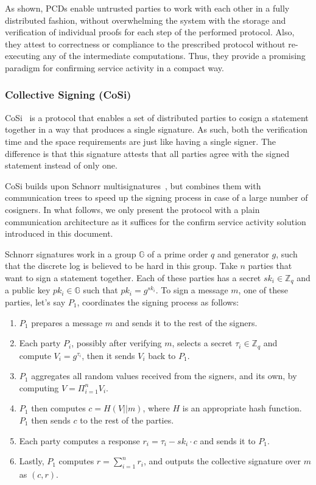 As shown, PCDs enable untrusted parties to work with each other in a fully distributed 
fashion, without overwhelming the system with the storage and verification of individual 
proofs for each step of the performed protocol. Also, they attest to correctness or compliance  
to the prescribed protocol without re-executing any of the intermediate computations. Thus, 
they provide a promising paradigm for confirming service activity in a compact way.


\subsubsection{Collective Signing (CoSi)}
\label{cosi}
CoSi~\cite{syta2016keeping} is a protocol that enables a set of distributed parties to cosign a 
statement together in a way that produces a single signature. As such, both the 
verification time and the space requirements are just like having a single signer. The 
difference is that this signature attests that all parties agree with the signed 
statement instead of only one.


CoSi builds upon Schnorr 
multisignatures~\cite{schnorr1991efficient, bellare2006multi, micali2001accountable}, but combines 
them with communication trees to speed up the signing process in 
case of a large number of cosigners. In what follows, we only present the protocol
with a plain communication architecture as it suffices for the confirm service activity 
solution introduced in this document.


Schnorr signatures work in a group $\mathbb{G}$ of a prime order $q$ and 
generator $g$, such that the discrete log is believed to be hard in this group. 
Take $n$ parties that want to sign a statement together. 
Each of these parties has a secret $sk_i \in \mathbb{Z}_q$ and a public key 
$pk_i \in \mathbb{G}$ such that $pk_i = g^{sk_i}$. To sign a message $m$, 
one of these parties, let's say $P_1$, coordinates the signing process as follows: 
\begin{enumerate}
\setlength{\itemsep}{0pt}
\item $P_1$ prepares a message $m$ and sends it to the rest of the signers.

\item Each party $P_i$, possibly after verifying 
$m$, selects a secret $\tau_i \in \mathbb{Z}_q$ and compute $V_i = g^{\tau_i}$, 
then it sends $V_i$ back to $P_1$.

\item $P_1$ aggregates all random values received from 
the signers, and its own, by computing $V = \Pi_{i =1}^n V_i$.

\item $P_1$ then computes 
$c = H(V||m)$, where $H$ is an appropriate hash function. $P_1$ then 
sends $c$ to the rest of the parties.

\item Each party computes a response $r_i = \tau_i - sk_i\cdot c$ and 
sends it to $P_1$.

\item Lastly, $P_1$ computes $r = \sum_{i=1}^n r_i$, and outputs the 
collective signature over $m$ as $(c, r)$.
\end{enumerate}


